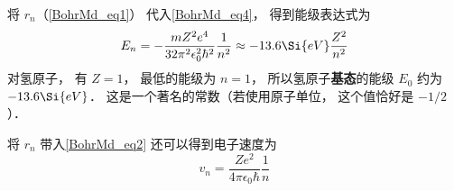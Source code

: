 将 $r_n$（\autoref{BohrMd_eq1}） 代入\autoref{BohrMd_eq4}， 得到能级表达式为
\begin{equation}\label{BohrMd_eq11}
E_n =  - \frac{mZ^2 e^4}{32\pi^2\epsilon_0^2 \hbar ^2} \frac{1}{n^2} \approx  - 13.6\Si{eV}\frac{Z^2}{n^2}
\end{equation}
对氢原子， 有 $Z = 1$， 最低的能级为 $n = 1$， 所以氢原子\textbf{基态}的能级 $E_0$ 约为 $-13.6\Si{eV}$． 这是一个著名的常数（若使用原子单位， 这个值恰好是 $-1/2$）．

将 $r_n$ 带入\autoref{BohrMd_eq2} 还可以得到电子速度为
\begin{equation}\label{BohrMd_eq10}
v_n = \frac{Z e^2}{4\pi\epsilon_0\hbar} \frac{1}{n}
\end{equation}
